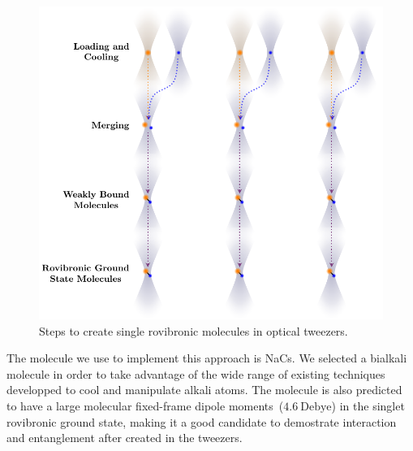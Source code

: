 \begin{figure}
  \centering
  \includegraphics[width=\textwidth]{figures/introduction_steps.pdf}
  \caption[Molecule creation steps.]{
    Steps to create single rovibronic molecules in optical tweezers.
    \label{fig:introduction:tweezers:plan:steps}}
\end{figure}

The molecule we use to implement this approach is NaCs.
We selected a bialkali molecule in order to take advantage of
the wide range of existing techniques developped to cool and manipulate alkali atoms.
The molecule is also predicted to have a large
molecular fixed-frame dipole moments~($4.6~\mathrm{Debye}$)
in the singlet rovibronic ground state,
making it a good candidate to demostrate interaction and entanglement
after created in the tweezers.


